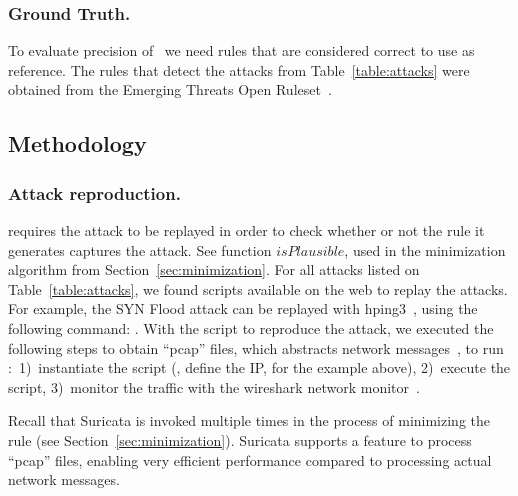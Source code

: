 \documentclass[sigconf,review, anonymous]{acmart}
\begin{document}
\subsubsection{Ground Truth.}To evaluate precision of \tname\ we
need rules that are considered correct to use as reference. The rules
that detect the attacks from Table~\ref{table:attacks} were obtained
from the Emerging Threats Open Ruleset~\cite{emerging-threats-open}.



\subsection{Methodology}

\subsubsection{Attack reproduction.}\label{attack-reproduction} \tname{} requires the attack to
be replayed in order to check whether or not the rule it generates
captures the attack.  See function $\mathit{isPlausible}$, used in the
minimization algorithm from Section~\ref{sec:minimization}. For all
attacks listed on Table~\ref{table:attacks}, we found scripts
available on the web to replay the attacks. For example, the SYN Flood
attack can be replayed with hping3~\cite{hping3}, using the following
command: . With the script to reproduce the attack, we executed the
following steps to obtain ``pcap'' files, which abstracts network
messages~\cite{pcap}, to run \tname:~1)~instantiate the script (\eg{},
define the IP, for the example above), 2)~execute the script,
3)~monitor the traffic with the wireshark network
monitor~\cite{wireshark-net-monitor}.

Recall that Suricata is invoked multiple times in the process of
minimizing the rule (see Section~\ref{sec:minimization}). Suricata
supports a feature to process ``pcap'' files, enabling very efficient
performance compared to processing actual network messages.
  
\end{document}
